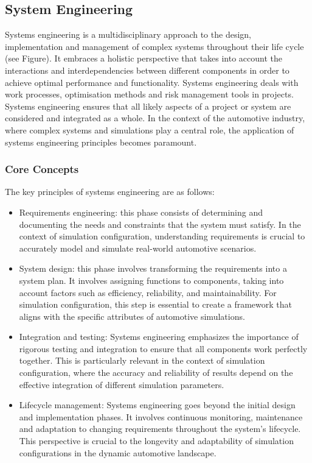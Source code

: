 \subsection{System Engineering \label{sec:sysen}}
Systems engineering is a multidisciplinary approach to the design, implementation and management of complex systems throughout their life cycle (see Figure). It embraces a holistic perspective that takes into account the interactions and interdependencies between different components in order to achieve optimal performance and functionality. Systems engineering deals with work processes, optimisation methods and risk management tools in projects. Systems engineering ensures that all likely aspects of a project or system are considered and integrated as a whole. In the context of the automotive industry, where complex systems and simulations play a central role, the application of systems engineering principles becomes paramount.

\subsubsection{Core Concepts}
    The key principles of systems engineering are as follows:
    \begin{itemize}
      \item Requirements engineering: this phase consists of determining and documenting the needs and constraints that the system must satisfy. In the context of simulation configuration, understanding requirements is crucial to accurately model and simulate real-world automotive scenarios.
      
      \item System design: this phase involves transforming the requirements into a system plan. It involves assigning functions to components, taking into account factors such as efficiency, reliability, and maintainability. For simulation configuration, this step is essential to create a framework that aligns with the specific attributes of automotive simulations.
      
      \item Integration and testing: Systems engineering emphasizes the importance of rigorous testing and integration to ensure that all components work perfectly together. This is particularly relevant in the context of simulation configuration, where the accuracy and reliability of results depend on the effective integration of different simulation parameters.
      
      \item Lifecycle management: Systems engineering goes beyond the initial design and implementation phases. It involves continuous monitoring, maintenance and adaptation to changing requirements throughout the system's lifecycle. This perspective is crucial to the longevity and adaptability of simulation configurations in the dynamic automotive landscape.

    \end{itemize}

